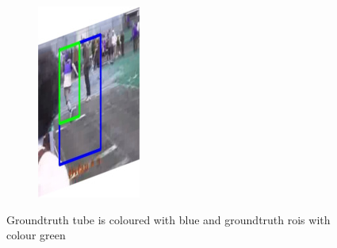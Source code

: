 \documentclass{report}
\begin{document}
\begin{figure}[h]
\begin{subfigure}{0.15\textwidth}
    \includegraphics[width=\textwidth]{output/img_15.jpg}
  \end{subfigure}
  \caption{Groundtruth tube is coloured with blue and groundtruth rois with colour green}
  \label{fig:gt_tubes_and_rois}
\end{figure}
\end{document}

